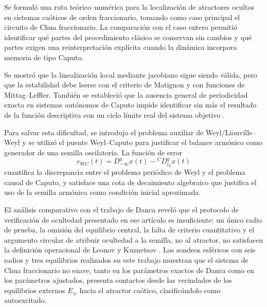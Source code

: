 \documentclass[journal]{IEEEtran}
\begin{document}
Se formuló una ruta teórico--numérica para la localización de atractores ocultos en sistemas caóticos de orden fraccionario, tomando como caso principal el circuito de Chua fraccionario. La comparación con el caso entero permitió identificar qué partes del procedimiento clásico se conservan sin cambios y qué partes exigen una reinterpretación explícita cuando la dinámica incorpora memoria de tipo Caputo.

Se mostró que la linealización local mediante jacobiano sigue siendo válida, pero que la estabilidad debe leerse con el criterio de Matignon y con funciones de Mittag--Leffler. También se estableció que la ausencia general de periodicidad exacta en sistemas autónomos de Caputo impide identificar sin más el resultado de la función descriptiva con un ciclo límite real del sistema objetivo \cite{TavazoeiHaeri2009,AreaLosadaNieto2014}.

Para salvar esta dificultad, se introdujo el problema auxiliar de Weyl/Liouville--Weyl y se utilizó el puente Weyl--Caputo para justificar el balance armónico como generador de una semilla oscilatoria. La función de error
\[
e_{WC}(t)=D_{-\infty}^{q}x(t)-{}^{C}D_{t_0}^{q}x(t)
\]
cuantifica la discrepancia entre el problema periódico de Weyl y el problema causal de Caputo, y satisface una cota de decaimiento algebraico que justifica el uso de la semilla armónica como condición inicial aproximada.

El análisis comparativo con el trabajo de Danca \cite{Danca2017} reveló que el protocolo de verificación de ocultedad presentado en ese artículo es insuficiente: un único radio de prueba, la omisión del equilibrio central, la falta de criterio cuantitativo y el argumento circular de atribuir ocultedad a la semilla, no al atractor, no satisfacen la definición operacional de Leonov y Kuznetsov \cite{LeonovKuznetsov2013}. Los sondeos esféricos con seis radios y tres equilibrios realizados en este trabajo muestran que el sistema de Chua fraccionario no suave, tanto en los parámetros exactos de Danca como en los parámetros ajustados, presenta contactos desde las vecindades de los equilibrios externos $E_\pm$ hacia el atractor caótico, clasificándolo como autoexcitado.




\end{document}
